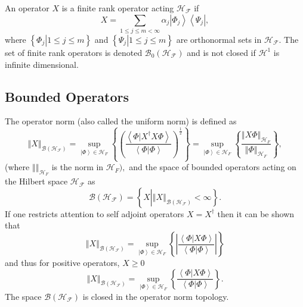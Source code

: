 \documentclass[aps,preprint,amsfonts,amssymb,showpacs,showkeys]{revtex4}%
\begin{document}
An operator $X$ is a finite rank operator acting $\mathcal{H}_{\mathcal{F}}$
if
\begin{equation}
X=\sum_{1\leq j\leq m<\infty}\alpha_{j}\left\vert \Phi_{j}\right\rangle
\left\langle \Psi_{j}\right\vert ,
\end{equation}
where $\left\{  \left.  \Phi_{j}\right\vert 1\leq j\leq m\right\}  $ and
$\left\{  \left.  \Psi_{j}\right\vert 1\leq j\leq m\right\}  $ are orthonormal
sets in $\mathcal{H}_{\mathcal{F}}.$ The set of finite rank operators is
denoted $\mathcal{B}_{0}\left(  \mathcal{H}_{\mathcal{F}}\right)  $ and is not
closed if $\mathcal{H}^{1}$ is infinite dimensional.

\subsection{Bounded Operators}

The operator norm (also called the uniform norm) is defined as
\begin{equation}
\left\Vert X\right\Vert _{\mathcal{B}\left(  \mathcal{H}_{\mathcal{F}}\right)
}=\sup_{\left\vert \Phi\right\rangle \in\mathcal{H}_{F}}\left\{  \left(
\frac{\left\langle \left.  \Phi\right\vert X^{\dagger}X\Phi\right\rangle
}{\left\langle \left.  \Phi\right\vert \Phi\right\rangle }\right)  ^{\frac
{1}{2}}\right\}  =\sup_{\left\vert \Phi\right\rangle \in\mathcal{H}_{F}%
}\left\{  \frac{\left\Vert X\Phi\right\Vert _{\mathcal{H}_{F}}}{\left\Vert
\Phi\right\Vert _{\mathcal{H}_{F}}}\right\}  ,
\end{equation}
(where $\left\Vert {}\right\Vert _{\mathcal{H}_{F}}$ is the norm in
$\mathcal{H}_{F}),$ and the space of bounded operators acting on the Hilbert
space $\mathcal{H}_{\mathcal{F}}$ as
\begin{equation}
\mathcal{B}\left(  \mathcal{H}_{\mathcal{F}}\right)  =\left\{  X\left\vert
\left\Vert X\right\Vert _{\mathcal{B}\left(  \mathcal{H}_{\mathcal{F}}\right)
}<\infty\right.  \right\}  .
\end{equation}
If one restricts attention to self adjoint operators $X=X^{\dagger}$ then it
can be shown that
\begin{equation}
\left\Vert X\right\Vert _{\mathcal{B}\left(  \mathcal{H}_{\mathcal{F}}\right)
}=\sup_{\left\vert \Phi\right\rangle \in\mathcal{H}_{F}}\left\{  \left\vert
\frac{\left\langle \left.  \Phi\right\vert X\Phi\right\rangle }{\left\langle
\left.  \Phi\right\vert \Phi\right\rangle }\right\vert \right\}
\end{equation}
and thus for positive operators, $X\geq0$%
\begin{equation}
\left\Vert X\right\Vert _{\mathcal{B}\left(  \mathcal{H}_{\mathcal{F}}\right)
}=\sup_{\left\vert \Phi\right\rangle \in\mathcal{H}_{F}}\left\{
\frac{\left\langle \left.  \Phi\right\vert X\Phi\right\rangle }{\left\langle
\left.  \Phi\right\vert \Phi\right\rangle }\right\}  .
\end{equation}
The space $\mathcal{B}\left(  \mathcal{H}_{\mathcal{F}}\right)  $ is closed in
the operator norm topology.
\end{document}
